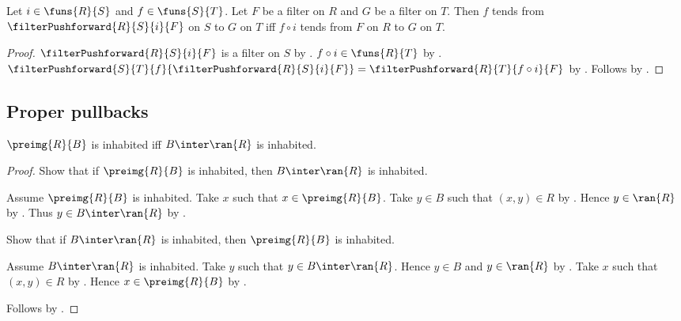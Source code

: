 \begin{theorem}\label{filter_tendsto_from_pushforward_iff_composition}
    Let $i\in\funs{R}{S}$ and $f\in\funs{S}{T}$.
    Let $F$ be a filter on $R$ and $G$ be a filter on $T$.
    Then $f$ tends from
        $\filterPushforward{R}{S}{i}{F}$ on $S$ to $G$ on $T$ iff
        $f\circ i$ tends from $F$ on $R$ to $G$ on $T$.
\end{theorem}
\begin{proof}
    $\filterPushforward{R}{S}{i}{F}$ is a filter on $S$ by
        .
    $f\circ i\in\funs{R}{T}$ by .
    $\filterPushforward{S}{T}{f}{
        \filterPushforward{R}{S}{i}{F}}
        =\filterPushforward{R}{T}{f\circ i}{F}$ by
        .
    Follows by .
\end{proof}

\subsection{Proper pullbacks}

\begin{proposition}\label{preimage_inhabited_iff_intersects_range}
    $\preimg{R}{B}$ is inhabited iff $B\inter\ran{R}$ is inhabited.
\end{proposition}
\begin{proof}
    Show that if $\preimg{R}{B}$ is inhabited, then
        $B\inter\ran{R}$ is inhabited.
    \begin{subproof}
        Assume $\preimg{R}{B}$ is inhabited.
        Take $x$ such that $x\in\preimg{R}{B}$.
        Take $y\in B$ such that $(x,y)\in R$ by .
        Hence $y\in\ran{R}$ by .
        Thus $y\in B\inter\ran{R}$ by .
    \end{subproof}
    Show that if $B\inter\ran{R}$ is inhabited, then
        $\preimg{R}{B}$ is inhabited.
    \begin{subproof}
        Assume $B\inter\ran{R}$ is inhabited.
        Take $y$ such that $y\in B\inter\ran{R}$.
        Hence $y\in B$ and $y\in\ran{R}$ by .
        Take $x$ such that $(x,y)\in R$ by .
        Hence $x\in\preimg{R}{B}$ by .
    \end{subproof}
    Follows by \auto.
\end{proof}

